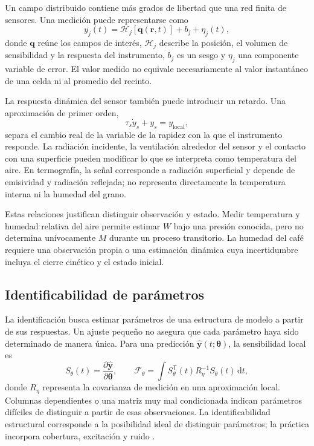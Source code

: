 Un campo distribuido contiene más grados de libertad que una red finita de sensores. Una medición puede representarse como
\begin{equation}
y_j(t)=\mathcal H_j[\mathbf q(\mathbf r,t)]+b_j+\eta_j(t),
\label{eq:operador_medicion}
\end{equation}
donde $\mathbf q$ reúne los campos de interés, $\mathcal H_j$ describe la posición, el volumen de sensibilidad y la respuesta del instrumento, $b_j$ es un sesgo y $\eta_j$ una componente variable de error. El valor medido no equivale necesariamente al valor instantáneo de una celda ni al promedio del recinto.

La respuesta dinámica del sensor también puede introducir un retardo. Una aproximación de primer orden,
\begin{equation}
\tau_s\dot y_s+y_s=y_{\mathrm{local}},
\label{eq:dinamica_sensor}
\end{equation}
separa el cambio real de la variable de la rapidez con la que el instrumento responde. La radiación incidente, la ventilación alrededor del sensor y el contacto con una superficie pueden modificar lo que se interpreta como temperatura del aire. En termografía, la señal corresponde a radiación superficial y depende de emisividad y radiación reflejada; no representa directamente la temperatura interna ni la humedad del grano.

Estas relaciones justifican distinguir observación y estado. Medir temperatura y humedad relativa del aire permite estimar $W$ bajo una presión conocida, pero no determina unívocamente $M$ durante un proceso transitorio. La humedad del café requiere una observación propia o una estimación dinámica cuya incertidumbre incluya el cierre cinético y el estado inicial.

\subsection{Identificabilidad de parámetros}

La identificación busca estimar parámetros de una estructura de modelo a partir de sus respuestas. Un ajuste pequeño no asegura que cada parámetro haya sido determinado de manera única. Para una predicción $\widehat{\mathbf y}(t;\boldsymbol\theta)$, la sensibilidad local es
\begin{equation}
S_\theta(t)=\frac{\partial\widehat{\mathbf y}}{\partial\boldsymbol\theta},
\qquad
\mathcal F_\theta=
\int S_\theta^{\mathsf T}(t)R_\eta^{-1}S_\theta(t)\,\mathrm{d}t,
\label{eq:informacion_parametrica}
\end{equation}
donde $R_\eta$ representa la covarianza de medición en una aproximación local. Columnas dependientes o una matriz muy mal condicionada indican parámetros difíciles de distinguir a partir de esas observaciones. La identificabilidad estructural corresponde a la posibilidad ideal de distinguir parámetros; la práctica incorpora cobertura, excitación y ruido \cite{ljung1999}.

